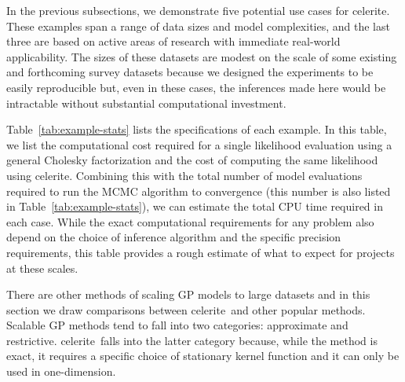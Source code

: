 \documentclass[manuscript, letterpaper]{aastex6}
\makeatletter
\let\origsection\section
\renewcommand\section{\@ifstar{\starsection}{\nostarsection}}
\newcommand\nostarsection[1]{\sectionprelude\origsection{#1}}
\newcommand\starsection[1]{\sectionprelude\origsection*{#1}}
\newcommand\sectionprelude{\vspace{1em}}
\newcommand{\project}[1]{\textsf{#1}}
\newcommand{\celerite}{\project{celerite}}
\newcommand{\sectlabel}[1]{\label{sect:#1}}
\newcommand{\response}[1]{{#1}}
\makeatother
\begin{document}
\response{In the previous subsections, we demonstrate five potential use
    cases for \celerite.
    These examples span a range of data sizes and model complexities, and the last
    three are based on active areas of research with immediate real-world
    applicability.
    The sizes of these datasets are modest on the scale of some existing and
    forthcoming survey datasets because we designed the experiments to be easily
    reproducible but, even in these cases, the inferences made here would be
    intractable without substantial computational investment.

    Table~\ref{tab:example-stats} lists the specifications of each example.
    In this table, we list the computational cost required for a single likelihood
    evaluation using a general Cholesky factorization and the cost of computing
    the same likelihood using \celerite.
    Combining this with the total number of model evaluations required to run the
    MCMC algorithm to convergence (this number is also listed in
    Table~\ref{tab:example-stats}), we can estimate the total CPU time required in
    each case.
    While the exact computational requirements for any problem also depend on the
    choice of inference algorithm and the specific precision requirements, this
    table provides a rough estimate of what to expect for projects at these
    scales.
}



\section{Comparisons to other methods}\sectlabel{compare}

There are other methods of scaling GP models to large datasets and in this
section we draw comparisons between \celerite\ and other popular methods.
Scalable GP methods tend to fall into two categories: approximate and
restrictive.
\celerite\ falls into the latter category because, while the method is exact,
it requires a specific choice of stationary kernel function and it can only be
used in one-dimension.
\end{document}
